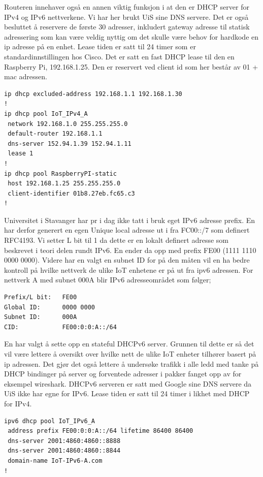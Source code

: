 \documentclass{article}
\begin{document}
Routeren innehaver også en annen viktig funksjon i at den er DHCP server for IPv4 og IPv6 nettverkene. Vi har her brukt UiS sine DNS servere. Det er også besluttet å reservere de første 30 adresser, inkludert gateway adresse til statisk adressering som kan være veldig nyttig om det skulle være behov for hardkode en ip adresse på en enhet. Lease tiden er satt til 24 timer som er standardinnstillingen hos Cisco. Det er satt en fast DHCP\cite{dhcplease} lease til den en Raspberry Pi, 192.168.1.25. Den er reservert ved client id som her består av 01 + mac adressen. 

\lstset{breaklines=true}
\begin{verbatim}
ip dhcp excluded-address 192.168.1.1 192.168.1.30
!
ip dhcp pool IoT_IPv4_A
 network 192.168.1.0 255.255.255.0
 default-router 192.168.1.1
 dns-server 152.94.1.39 152.94.1.11
 lease 1
!
ip dhcp pool RaspberryPI-static
 host 192.168.1.25 255.255.255.0
 client-identifier 01b8.27eb.fc65.c3
!
\end{verbatim}


Universitet i Stavanger har pr i dag ikke tatt i bruk eget IPv6 adresse prefix. En har derfor generert en egen Unique local adresse ut i fra FC00::/7 som definert RFC4193\cite{rfc4193d}. Vi setter L bit til 1 da dette er en lokalt definert adresse som beskrevet i teori delen rundt IPv6. En ender da opp med prefix FE00 (1111 1110 0000 0000). Videre har en valgt en subnet ID for på den måten vil en ha bedre kontroll på hvilke nettverk de ulike IoT enhetene er på ut fra ipv6 adressen. For nettverk A med subnet 000A blir IPv6 adresseområdet som følger;

\lstset{breaklines=true}
\begin{lstlisting}
Prefix/L bit:   FE00
Global ID:      0000 0000
Subnet ID:      000A
CID:            FE00:0:0:A::/64
\end{lstlisting}
\lstset{breaklines=true}

En har valgt å sette opp en stateful DHCPv6 server. Grunnen til dette er så det vil være lettere å oversikt over hvilke nett de ulike IoT enheter tilhører basert på ip adressen. Det gjør det også lettere å undersøke trafikk i alle ledd med tanke på DHCP bindinger på server og forventede adresser i pakker fanget opp av for eksempel wireshark. DHCPv6 serveren er satt med Google sine DNS servere da UiS ikke har egne for IPv6. Lease tiden er satt til 24 timer i likhet med DHCP for IPv4. 

\lstset{breaklines=true}
\begin{verbatim}
ipv6 dhcp pool IoT_IPv6_A
 address prefix FE00:0:0:A::/64 lifetime 86400 86400
 dns-server 2001:4860:4860::8888
 dns-server 2001:4860:4860::8844
 domain-name IoT-IPv6-A.com
!
\end{verbatim}
\end{document}

